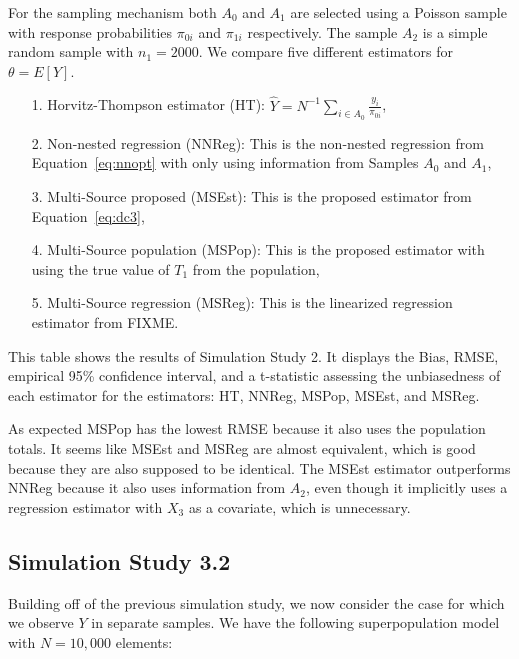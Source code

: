 \documentclass[12pt]{article}
\begin{document}
For the sampling mechanism both $A_0$ and $A_1$ are selected using a Poisson
sample with response probabilities $\pi_{0i}$ and $\pi_{1i}$ respectively. The
sample $A_2$ is a simple random sample with $n_1 = 2000$. We compare five
different estimators for $\theta = E[Y]$.

\begin{itemize}
  \item[1.] Horvitz-Thompson estimator (HT): $\hat Y = N^{-1} \sum_{i \in A_0}
    \frac{y_i}{\pi_{0i}}$,
  \item[2.] Non-nested regression (NNReg): This is the non-nested regression from
    Equation~\eqref{eq:nnopt} with only using information from Samples $A_0$ and
    $A_1$,
  \item[3.] Multi-Source proposed (MSEst): This is the proposed estimator from
    Equation~\eqref{eq:dc3},
  \item[4.] Multi-Source population (MSPop): This is the proposed estimator with
    using the true value of $T_1$ from the population,
  \item[5.] Multi-Source regression (MSReg): This is the linearized regression
    estimator from FIXME.
\end{itemize}

\begin{table}[ht!]
  \centering
  
\caption{This table shows the results of Simulation Study 2. It displays the
Bias, RMSE, empirical 95\% confidence interval, and a t-statistic assessing the
unbiasedness of each estimator for the estimators: HT, NNReg, MSPop, MSEst, and
MSReg.}
\label{tab:msdc-mean}
\end{table}

As expected MSPop has the lowest RMSE because it also uses the population
totals. It seems like MSEst and MSReg are almost equivalent, which is good
because they are also supposed to be identical. The MSEst estimator outperforms
NNReg because it also uses information from $A_2$, even though it implicitly
uses a regression estimator with $X_3$ as a covariate, which is unnecessary.

\subsection{Simulation Study 3.2}

Building off of the previous simulation study, we now consider the case for
which we observe $Y$ in separate samples.
We have the following superpopulation model with $N = 10,000$ elements:
\end{document}
